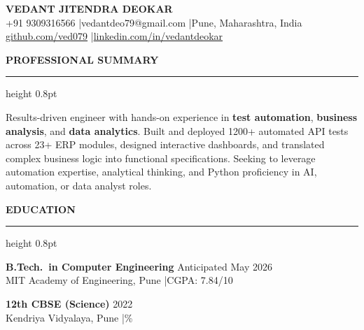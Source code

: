 \documentclass[11pt,letterpaper]{article}
\renewcommand{\section}[1]{
  \vspace{6pt}
  {\bfseries\large #1}
  \vspace{2pt}
  \hrule height 0.8pt
  \vspace{4pt}
}
\begin{document}
\begin{center}
  {\LARGE\bfseries VEDANT JITENDRA DEOKAR}\\[4pt]
  +91 9309316566 \quad|\quad vedantdeo79@gmail.com \quad|\quad Pune, Maharashtra, India\\[2pt]
  \href{https://github.com/ved079}{github.com/ved079} \quad|\quad \href{https://linkedin.com/in/vedantdeokar}{linkedin.com/in/vedantdeokar}
\end{center}

\vspace{4pt}

\section{PROFESSIONAL SUMMARY}

Results-driven engineer with hands-on experience in \textbf{test automation}, \textbf{business analysis}, and \textbf{data analytics}. Built and deployed 1200+ automated API tests across 23+ ERP modules, designed interactive dashboards, and translated complex business logic into functional specifications. Seeking to leverage automation expertise, analytical thinking, and Python proficiency in AI, automation, or data analyst roles.

\vspace{2pt}

\section{EDUCATION}

\textbf{B.Tech.\ in Computer Engineering} \hfill Anticipated May 2026\\
MIT Academy of Engineering, Pune \quad|\quad CGPA: 7.84/10

\vspace{3pt}

\textbf{12th CBSE (Science)} \hfill 2022\\
Kendriya Vidyalaya, Pune \quad|\%

\vspace{2pt}
\end{document}
